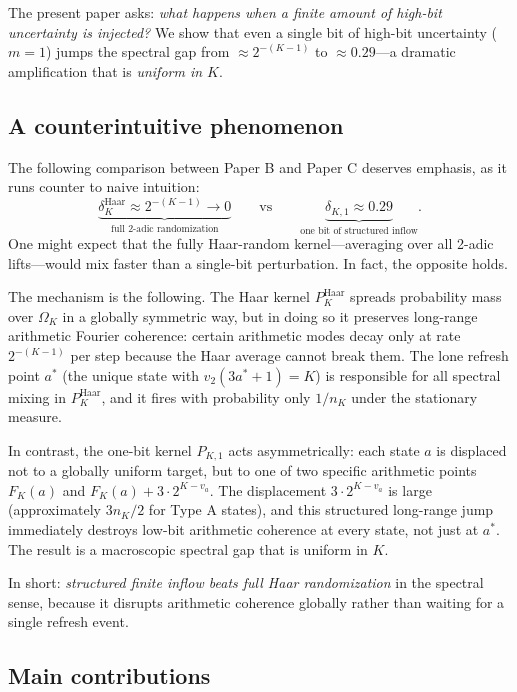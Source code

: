 \documentclass[12pt]{article}
\theoremstyle{definition}
\newcommand{\vt}{v_2}
\newcommand{\PKone}{P_{K,1}}
\begin{document}
The present paper asks: \emph{what happens when a finite amount of high-bit uncertainty is injected?} We show that even a single bit of high-bit uncertainty ($m=1$) jumps the spectral gap from $\approx 2^{-(K-1)}$ to $\approx 0.29$---a dramatic amplification that is \emph{uniform in $K$}.

\subsection*{A counterintuitive phenomenon}

The following comparison between Paper B and Paper C deserves emphasis, as it runs counter to naive intuition:
\[
  \underbrace{\delta_K^{\mathrm{Haar}} \approx 2^{-(K-1)} \to 0}_{\text{full 2-adic randomization}} \qquad\text{vs}\qquad \underbrace{\delta_{K,1} \approx 0.29}_{\text{one bit of structured inflow}}.
\]
One might expect that the fully Haar-random kernel---averaging over all 2-adic lifts---would mix faster than a single-bit perturbation. In fact, the opposite holds.

The mechanism is the following. The Haar kernel $P_K^{\mathrm{Haar}}$ spreads probability mass over $\Omega_K$ in a globally symmetric way, but in doing so it preserves long-range arithmetic Fourier coherence: certain arithmetic modes decay only at rate $2^{-(K-1)}$ per step because the Haar average cannot break them. The lone refresh point $a^*$ (the unique state with $\vt(3a^*+1) = K$) is responsible for all spectral mixing in $P_K^{\mathrm{Haar}}$, and it fires with probability only $1/n_K$ under the stationary measure.

In contrast, the one-bit kernel $\PKone$ acts asymmetrically: each state $a$ is displaced not to a globally uniform target, but to one of two specific arithmetic points $F_K(a)$ and $F_K(a) + 3\cdot 2^{K-v_a}$. The displacement $3\cdot 2^{K-v_a}$ is large (approximately $3n_K/2$ for Type A states), and this structured long-range jump immediately destroys low-bit arithmetic coherence at every state, not just at $a^*$. The result is a macroscopic spectral gap that is uniform in $K$.

In short: \emph{structured finite inflow beats full Haar randomization} in the spectral sense, because it disrupts arithmetic coherence globally rather than waiting for a single refresh event.

\subsection*{Main contributions}
\end{document}
